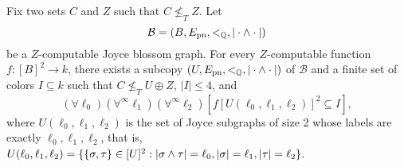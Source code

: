 \begin{theorem}\label{thm:blossom-limit-cone-avoidance}
Fix two sets $C$ and $Z$ such that $C \not \leq_T Z$.
Let
\[
	\mathcal{B} = (B, E_{\mathrm{pn}}, <_{\mathbb{Q}}, |\cdot \wedge \cdot|)
\]
be a $Z$-computable Joyce blossom graph. For every $Z$-computable function $f: [B]^2 \to k$, there exists a subcopy $(U, E_{\mathrm{pn}}, <_{\mathbb{Q}}, |\cdot \wedge \cdot|)$ of $\mathcal{B}$ and a finite set of colors $I \subseteq k$ such that $C \not \leq_T U \oplus Z$, $|I| \leq 4$, and 
$$
(\forall \ell_0)( \forall^{\infty} \ell_1)( \forall^{\infty} \ell_2)[ f[U(\ell_0, \ell_1, \ell_2)]^2 \subseteq I],
$$
where $U(\ell_0, \ell_1, \ell_2)$ is the set of Joyce subgraphs of size 2 whose labels are exactly $\ell_0, \ell_1, \ell_2$, that is,  $U(\ell_0, \ell_1, \ell_2) = \{ \{\sigma, \tau\} \in [U]^2: |\sigma \wedge \tau| = \ell_0, |\sigma| = \ell_1, |\tau| = \ell_2 \}$.
\end{theorem}
